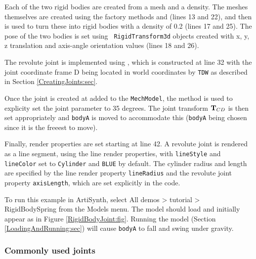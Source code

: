 Each of the two rigid bodies are created from a mesh and a density.
The meshes themselves are created using the factory methods
 and
(lines 13 and 22), and then
 is
used to turn these into rigid bodies with a density of 0.2 (lines 17
and 25). The pose of the two bodies is set using {\tt
RigidTransform3d} objects created with x, y, z translation and
axis-angle orientation values (lines 18 and 26).

The revolute joint is implemented using
, which is
constructed at line 32 with the joint coordinate frame D being located
in world coordinates by {\tt TDW} 
as described in Section \ref{CreatingJoints:sec}.

Once the joint is created at added to the {\tt MechModel}, the method
 is
used to explicity set the joint parameter to 35 degrees. The joint
transform ${\bf T}_{CD}$ is then set appropriately and {\tt bodyA} is moved
to accommodate this ({\tt bodyA} being chosen since it is the freeest
to move).

Finally, render properties are set starting at line 42. A revolute
joint is rendered as a line segment, using the line render properties,
with {\tt lineStyle} and {\tt lineColor} set to {\tt Cylinder} and
{\tt BLUE} by default. The cylinder radius and length are specified by
the line render property {\tt lineRadius} and the revolute joint
property {\tt axisLength}, which are set explicitly in the code.

To run this example in ArtiSynth, select {\sf All demos > tutorial >
RigidBodySpring} from the {\sf Models} menu. The model should load and
initially appear as in Figure \ref{RigidBodyJoint:fig}.  Running the
model (Section \ref{LoadingAndRunning:sec}) will cause {\tt bodyA} to
fall and swing under gravity.

\subsubsection{Commonly used joints}
\label{CommonJoints:sec}

